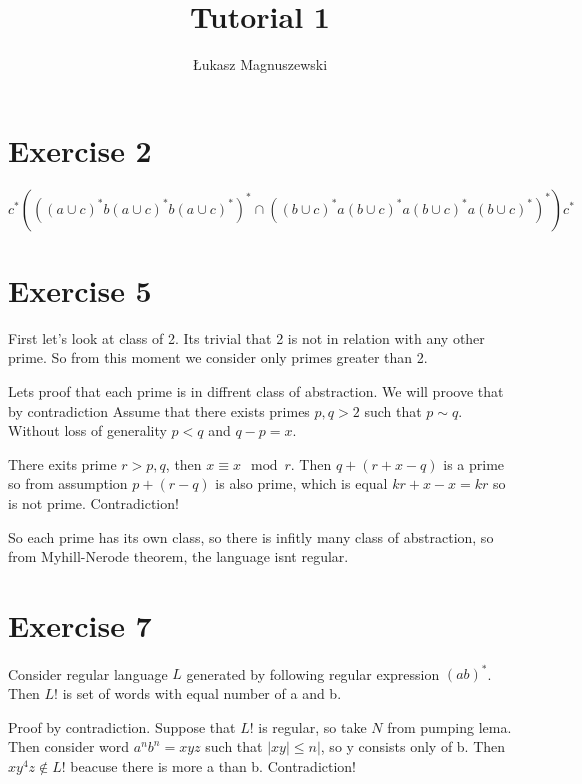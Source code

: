 \documentclass{article}
\title{Tutorial 1}
\author{Łukasz Magnuszewski}
\begin{document}
\maketitle

\section*{Exercise 2}
\[
  c^*
  (
    ((a \cup c)^*  b (a \cup c)^* b (a \cup c)^*)^*
    \cap 
    ((b \cup c)^*  a (b \cup c)^* a (b \cup c)^* a (b \cup c)^*)^* 
  )
  c^*
\]

\section*{Exercise 5}
First let's look at class of 2. Its trivial that 2 is not in relation with any other prime.
So from this moment we consider only primes greater than 2.

Lets proof that each prime is in diffrent class of abstraction. We will proove that by contradiction
Assume that there exists primes $p,q > 2$ such that $p \sim q$. Without loss of generality
$p < q$ and $q-p = x$. 

There exits prime $r > p,q$, then $x \equiv x \mod r$. Then $q + (r + x - q)$ is a prime so from assumption
$p + (r  - q)$ is also prime, which is equal $k r + x - x = k r$ so is not prime.
Contradiction! 


So each prime has its own class, so there is infitly many class of abstraction, so from Myhill-Nerode theorem, 
the language isnt regular.


\section*{Exercise 7}
Consider regular language $L$ generated by following regular expression $(ab)^*$. Then $L!$ 
is set of words with equal number of a and b. 

Proof by contradiction. Suppose that $L!$ is regular, so take $N$ from pumping lema. Then consider word 
$a^n b^n = x y z$ such that $|x y| \leq n|$, so y consists only of b. Then $x y^4 z \not \in L!$ 
beacuse there is more a than b. Contradiction!
\end{document}
